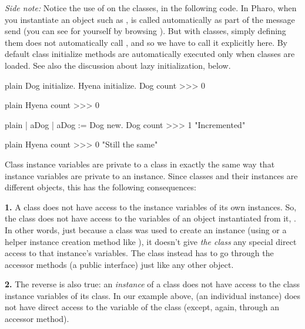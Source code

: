 \documentclass[10pt,twoside,english]{_support/latex/sbabook/sbabook}
\begin{document}
\textit{Side note:} Notice the use of  on the classes, in the following
code. In Pharo, when you instantiate an object such as ,
 is called automatically as part of the  message send (you
can see for yourself by browsing ). But with classes, simply
defining them does not automatically call , and so we have to call
it explicitly here. By default class initialize methods are automatically
executed only when classes are loaded. See also the discussion about lazy
initialization, below.

\begin{listing}[float, label=scr:dogCount2]{plain}{}
Dog initialize.
Hyena initialize.
Dog count
>>> 0
\end{listing}

\begin{displaycode}{plain}
Hyena count
>>> 0
\end{displaycode}

\begin{displaycode}{plain}
| aDog |
aDog := Dog new.
Dog count
>>> 1  "Incremented"
\end{displaycode}

\begin{displaycode}{plain}
Hyena count
>>> 0  "Still the same"
\end{displaycode}

Class instance variables are private to a class in exactly the same way that
instance variables are private to an instance. Since classes and their
instances are different objects, this has the following consequences:

\textbf{1.} A class does not have access to the instance variables of its own
instances. So, the class  does not have access to the variables of an
object instantiated from it, . In other words, just because a class
was used to create an instance (using  or a helper instance creation
method like ), it doesn't give \textit{the class} any special direct
access to that instance's variables. The class instead has to go through the
accessor methods (a public interface) just like any other object.

\textbf{2.} The reverse is also true: an \textit{instance} of a class does not have access
to the class instance variables of its class. In our example above, 
(an individual instance) does not have direct access to the  variable
of the  class (except, again, through an accessor method).
\end{document}
